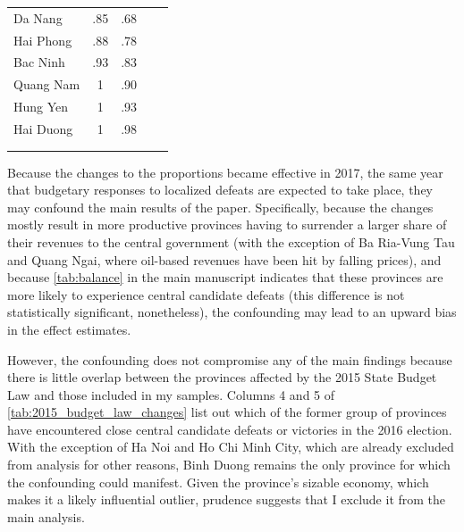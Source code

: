\documentclass[12pt]{article}
\newcommand{\1}{\mathbbm{1}}
\begin{document}
\begin{table}[!htp]
\begin{tabular}{@{}lccll@{}}
			Da Nang          & .85 & .68 &                       &                       \\
			Hai Phong        & .88 & .78 &                       &                       \\
			Bac Ninh         & .93 & .83 &                       &                       \\
			Quang Nam        & 1   & .90 &                       &                       \\
			Hung Yen         & 1   & .93 &                       &                       \\
			Hai Duong        & 1   & .98 &                       &                       \\ 
			\\[-1.8ex] 
			\hline
			\hline
			\\[-1.8ex]
		\end{tabular}
	
\end{table}

Because the changes to the proportions became effective in 2017, the same year that budgetary responses to localized defeats are expected to take place, they may confound the main results of the paper. Specifically, because the changes mostly result in more productive provinces having to surrender a larger share of their revenues to the central government (with the exception of Ba Ria-Vung Tau and Quang Ngai, where oil-based revenues have been hit by falling prices), and because \autoref{tab:balance} in the main manuscript indicates that these provinces are more likely to experience central candidate defeats (this difference is not statistically significant, nonetheless), the confounding may lead to an upward bias in the effect estimates.

However, the confounding does not compromise any of the main findings because there is little overlap between the provinces affected by the 2015 State Budget Law and those included in my samples. Columns 4 and 5 of \autoref{tab:2015_budget_law_changes} list out which of the former group of provinces have encountered close central candidate defeats or victories in the 2016 election. With the exception of Ha Noi and Ho Chi Minh City, which are already excluded from analysis for other reasons, Binh Duong remains the only province for which the confounding could manifest. Given the province's sizable economy, which makes it a likely influential outlier, prudence suggests that I exclude it from the main analysis.
\end{document}
